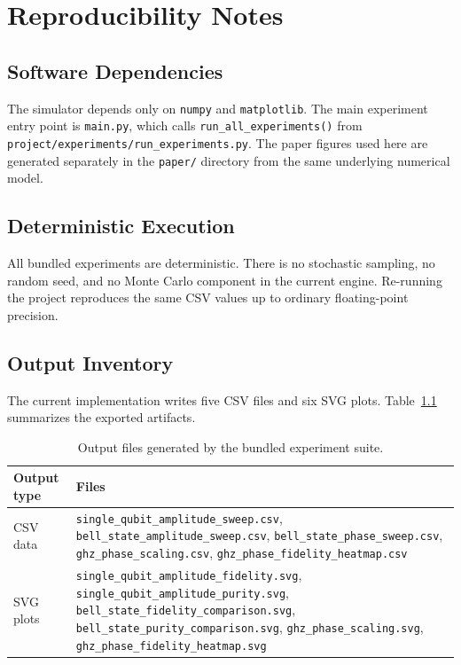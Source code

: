 \chapter{Reproducibility Notes}

\section{Software Dependencies}

The simulator depends only on \texttt{numpy} and \texttt{matplotlib}. The main experiment entry point is \texttt{main.py}, which calls \texttt{run\_all\_experiments()} from \texttt{project/experiments/run\_experiments.py}. The paper figures used here are generated separately in the \texttt{paper/} directory from the same underlying numerical model.

\section{Deterministic Execution}

All bundled experiments are deterministic. There is no stochastic sampling, no random seed, and no Monte Carlo component in the current engine. Re-running the project reproduces the same CSV values up to ordinary floating-point precision.

\section{Output Inventory}

The current implementation writes five CSV files and six SVG plots. Table~\ref{tab:outputs} summarizes the exported artifacts.

\begin{table}[t]
\centering
\caption{Output files generated by the bundled experiment suite.}
\label{tab:outputs}
\begin{tabular}{p{2.6cm} p{10.0cm}}
\toprule
Output type & Files \\
\midrule
CSV data &
\texttt{single\_qubit\_amplitude\_sweep.csv}, \texttt{bell\_state\_amplitude\_sweep.csv}, \texttt{bell\_state\_phase\_sweep.csv}, \texttt{ghz\_phase\_scaling.csv}, \texttt{ghz\_phase\_fidelity\_heatmap.csv} \\
SVG plots &
\texttt{single\_qubit\_amplitude\_fidelity.svg}, \texttt{single\_qubit\_amplitude\_purity.svg}, \texttt{bell\_state\_fidelity\_comparison.svg}, \texttt{bell\_state\_purity\_comparison.svg}, \texttt{ghz\_phase\_scaling.svg}, \texttt{ghz\_phase\_fidelity\_heatmap.svg} \\
\bottomrule
\end{tabular}
\end{table}
